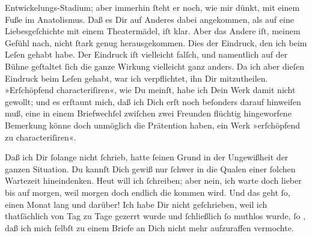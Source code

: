                Entwickelungs-Stadium; aber immerhin{ }ſteht er noch, wie mir dünkt, mit einem Fuße im
                  Anatolismus. Daß es Dir auf Anderes dabei
               angekommen, als auf eine Liebesgeſchichte mit einem Theatermädel, iſt klar. Aber das
               Andere iſt, meinem Gefühl nach, nicht{ }ſtark genug herausgekommen. Dies der Eindruck,
               den ich beim Leſen gehabt habe. Der Eindruck iſt vielleicht falſch, und namentlich
               auf der Bühne geſtaltet{ }ſich die ganze Wirkung vielleicht ganz anders. Da ich aber
               dieſen Eindruck beim Leſen gehabt, war ich verpflichtet, ihn \strikeout{\textcolor{gray}{×}} Dir mitzutheilen. »Erſchöpfend {\pb}characteriſiren«, wie Du meinſt, habe ich Dein Werk damit nicht gewollt; und es erſtaunt mich, daß ich Dich
               erſt noch beſonders darauf hinweiſen muß, eine in einem Briefwechſel zwiſchen zwei
               Freunden flüchtig hingeworfene Bemerkung könne doch unmöglich die Prätention haben,
               ein Werk »erſchöpfend zu characteriſiren«.\pend
           
\pstart
           Daß ich Dir{ }ſolange nicht{ }ſchrieb, hatte{ }ſeinen Grund in der Ungewißheit der ganzen
               Situation. Du kannſt Dich gewiß nur{ }ſchwer in die Qualen einer{ }ſolchen Wartezeit
               hineindenken. Heut will ich{ }ſchreiben; aber nein, ich warte doch lieber bis auf
               morgen, weil morgen doch endlich die \label{K_L02869-4v}\label{K_L02869-4} kommen wird. Und das geht{ }ſo, einen Monat lang und darüber! Ich habe Dir
               nicht geſchrieben, weil ich {\pb}thatſächlich von Tag zu
               Tage gezerrt wurde\strikeout{,} und{ }ſchließlich{ }ſo muthlos wurde,{ }ſo \label{K_L02869-5v}\label{K_L02869-5}, daß ich mich{ }ſelbſt zu einem Briefe an Dich nicht mehr
               aufzuraffen vermochte.\pend
           
